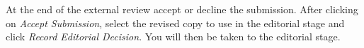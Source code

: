 At the end of the external review accept or decline the submission. After clicking on \textit{Accept Submission}, select the revised copy to use in the editorial stage and click \textit{Record Editorial Decision}. You will then be taken to the editorial stage.










